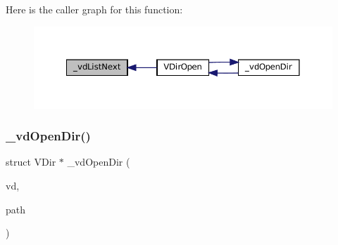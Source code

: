 Here is the caller graph for this function\+:
\nopagebreak
\begin{figure}[H]
\begin{center}
\leavevmode
\includegraphics[width=350pt]{vfs-dirent_8c_a1bce38da5091375ead1437ed86074c0e_icgraph}
\end{center}
\end{figure}
\mbox{\label{vfs-dirent_8c_a9d6bc6a6c2255b69ab39ee64c4da8456}} 
\subsubsection{\texorpdfstring{\+\_\+vd\+Open\+Dir()}{\_vdOpenDir()}}
{\footnotesize\ttfamily struct V\+Dir $\ast$ \+\_\+vd\+Open\+Dir (\begin{DoxyParamCaption}\item[{struct V\+Dir $\ast$}]{vd,  }\item[{const char $\ast$}]{path }\end{DoxyParamCaption})\hspace{0.3cm}{\ttfamily [static]}}

